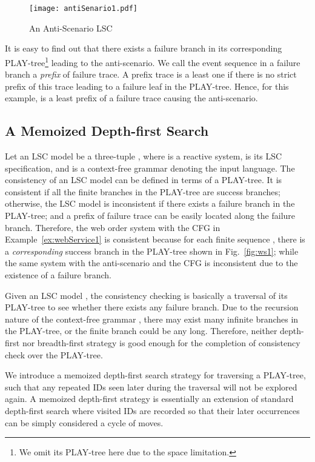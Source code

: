 \documentclass[]{llncs}
\begin{document}
\begin{figure}

  \begin{center}
    \texttt{[image: antiSenario1.pdf]}
  \end{center}

  \caption{An Anti-Scenario LSC}
  \label{fig:anti}
\end{figure}

It is easy to find out that there exists a failure branch
in its corresponding PLAY-tree\footnote{We omit its PLAY-tree
here due to the space limitation.} leading to the anti-scenario.
We call the event sequence in a failure branch
a {\em prefix} of failure trace. A prefix trace is a least one if
there is no strict prefix of this trace leading to a failure leaf
in the PLAY-tree. Hence, for this example,
 is
a least prefix of a failure trace causing the anti-scenario.

\subsection{A Memoized Depth-first Search}

Let an LSC model be a three-tuple , where
 is a reactive system,  is its LSC specification,
and  is a context-free grammar denoting the input language.
The consistency of an LSC model  can be defined in terms
of a PLAY-tree. It is consistent if all
the finite branches in the PLAY-tree are success branches;
otherwise, the LSC model
is inconsistent if there exists a failure branch in the PLAY-tree;
and a prefix of failure trace can be
easily located along the failure branch. Therefore,
the web order system with the CFG 
in Example~\ref{ex:webService1} is consistent because
for each finite sequence , there is a
{\em corresponding} success branch in the PLAY-tree
shown in Fig.~\ref{fig:ws1};
while the same system with the anti-scenario and the CFG 
is inconsistent due to the existence of a failure branch.

Given an LSC model , the consistency checking is basically
a traversal of its PLAY-tree to see whether there exists any failure branch.
Due to the recursion nature of the context-free grammar ,
there may exist many infinite branches in the PLAY-tree, or
the finite branch could be any long.
Therefore, neither depth-first nor breadth-first strategy
is good enough for the completion of consistency check over
the PLAY-tree.

We introduce a memoized depth-first search strategy for
traversing a PLAY-tree, such that
any repeated IDs seen later during the traversal will not
be explored again. A memoized depth-first strategy is
essentially an extension of standard depth-first search
where visited IDs are recorded so that their later occurrences
can be simply considered a cycle of moves.
\end{document}
